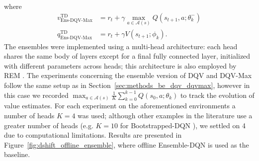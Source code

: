 where
\begin{align}
  v^{\scriptscriptstyle
  \textrm{TD}}_{\scriptscriptstyle\textrm{Ens-DQV-Max}}&=r_t+\gamma\max_{a\in\mathcal{A}\left(s\right)}Q\left(s_{t+1},a;\theta_k^{-}\right)\\
  q^{\scriptscriptstyle\textrm{TD}}_{\scriptscriptstyle\textrm{Ens-DQV-Max}}&=r_t+\gamma V\left(s_{t+1};\phi_k\right).
\end{align}
The ensembles were implemented using a multi-head architecture: each
head shares the same body of layers except for a final
fully connected layer, initialized with different parameters across
heads; this architecture is also employed by REM
\citep{agarwal2020optimistic}.
The experiments concerning the ensemble version of DQV and DQV-Max
follow the same setup as in Section~\ref{sec:methods_be_dqv_dqvmax},
however in this case we recorded
$\max_{a\in\mathcal{A}\left(s\right)}\frac{1}{K}\sum_{k=0}^{k-1}Q\left(s_0,a;\theta_k\right)$
to track the evolution of value estimates.
For each experiment on the aforementioned environments a number of
heads $K=4$ was used; although other examples in the literature use a
greater number of heads (e.g. $K=10$ for Bootstrapped-DQN
\citep{osband2016deep}), we settled on 4 due to computational
limitations. Results are presented in
Figure~\ref{fig:dshift_offline_ensemble}, where offline Ensemble-DQN
is used as the baseline.
